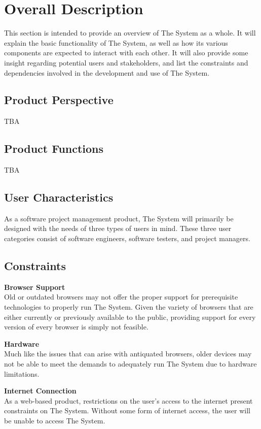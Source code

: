 \documentclass[12pt]{report}
\begin{document}
\section{Overall Description}
	This section is intended to provide an overview of The System as a whole.
	It will explain the basic functionality of The System, as well as how its various components are expected to interact with each other.
	It will also provide some insight regarding potential users and stakeholders, and list the constraints and dependencies involved in the development and use of The System.
	\subsection{Product Perspective}
		TBA
	\subsection{Product Functions}
		TBA
	\subsection{User Characteristics}
		As a software project management product, The System will primarily be designed with the needs of three types of users in mind.
		These three user categories consist of software engineers, software testers, and project managers.
	\subsection{Constraints}
		\begin{reqlist}
			\item \textbf{Browser Support} \\
				Old or outdated browsers may not offer the proper support for prerequisite technologies to properly run The System.
				Given the variety of browsers that are either currently or previously available to the public, providing support for every version of every browser is simply not feasible.
			\item \textbf{Hardware} \\
				Much like the issues that can arise with antiquated browsers, older devices may not be able to meet the demands to adequately run The System due to hardware limitations.
			\item \textbf{Internet Connection} \\
				As a web-based product, restrictions on the user's access to the internet present constraints on The System.
				Without some form of internet access, the user will be unable to access The System.
		\end{reqlist}
\end{document}
